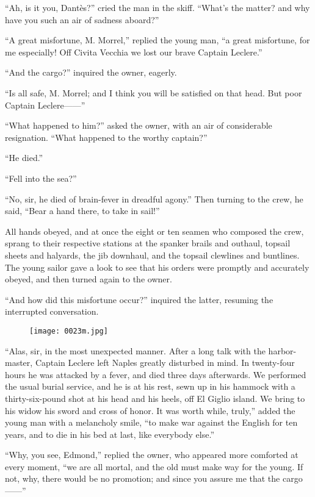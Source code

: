 “Ah, is it you, Dantès?” cried the man in the skiff. “What’s the
matter? and why have you such an air of sadness aboard?”

“A great misfortune, M. Morrel,” replied the young man, “a great
misfortune, for me especially! Off Civita Vecchia we lost our brave
Captain Leclere.”

“And the cargo?” inquired the owner, eagerly.

“Is all safe, M. Morrel; and I think you will be satisfied on that
head. But poor Captain Leclere——”

“What happened to him?” asked the owner, with an air of considerable
resignation. “What happened to the worthy captain?”

“He died.”

“Fell into the sea?”

“No, sir, he died of brain-fever in dreadful agony.” Then turning to
the crew, he said, “Bear a hand there, to take in sail!”

All hands obeyed, and at once the eight or ten seamen who composed the
crew, sprang to their respective stations at the spanker brails and
outhaul, topsail sheets and halyards, the jib downhaul, and the topsail
clewlines and buntlines. The young sailor gave a look to see that his
orders were promptly and accurately obeyed, and then turned again to
the owner.

“And how did this misfortune occur?” inquired the latter, resuming the
interrupted conversation.

\begin{figure}[h]
\texttt{[image: 0023m.jpg]}
\end{figure}

“Alas, sir, in the most unexpected manner. After a long talk with the
harbor-master, Captain Leclere left Naples greatly disturbed in mind.
In twenty-four hours he was attacked by a fever, and died three days
afterwards. We performed the usual burial service, and he is at his
rest, sewn up in his hammock with a thirty-six-pound shot at his head
and his heels, off El Giglio island. We bring to his widow his sword
and cross of honor. It was worth while, truly,” added the young man
with a melancholy smile, “to make war against the English for ten
years, and to die in his bed at last, like everybody else.”

“Why, you see, Edmond,” replied the owner, who appeared more comforted
at every moment, “we are all mortal, and the old must make way for the
young. If not, why, there would be no promotion; and since you assure
me that the cargo——”

